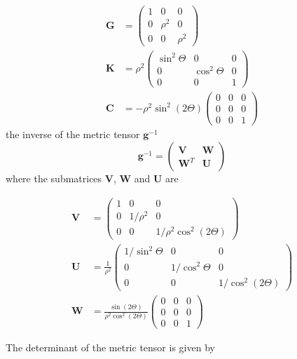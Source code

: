 \documentclass{article}
\begin{document}
\begin{align}
\bm{G} &=
\begin{pmatrix}
1 & 0      & 0\\
0 & \rho^2 & 0\\
0 & 0      & \rho^2
\end{pmatrix}\\
\bm{K} &=
\rho^2
\begin{pmatrix}
\sin^2\Theta & 0            & 0\\
0            & \cos^2\Theta & 0\\
0            & 0            & 1
\end{pmatrix}\\
\bm{C} &=
-\rho^2\sin^2(2\Theta)
\begin{pmatrix}
0 & 0 & 0\\
0 & 0 & 0\\
0 & 0 & 1
\end{pmatrix}
\end{align}
the inverse of the metric tensor $\bm{g}^{-1}$
\begin{equation}
\bm{g}^{-1}=
\begin{pmatrix}
\bm{V} & \bm{W}\\
\bm{W}^T & \bm{U}
\end{pmatrix}
\end{equation}
where the submatrices $\bm{V}$, $\bm{W}$ and $\bm{U}$ are 

\begin{align}
\bm{V} &=
\begin{pmatrix}
1 & 0      & 0\\
0 & 1/\rho^2 & 0\\
0 & 0      & 1/\rho^2\cos^2(2\Theta)
\end{pmatrix}\\
\bm{U} &=
\frac{1}{\rho^2}
\begin{pmatrix}
1/\sin^2\Theta & 0            & 0\\
0            & 1/\cos^2\Theta & 0\\
0            & 0            & 1/\cos^2(2\Theta)
\end{pmatrix}\\
\bm{W} &=
\frac{\sin(2\Theta)}{\rho^2\cos^2(2\Theta)}
\begin{pmatrix}
0 & 0 & 0\\
0 & 0 & 0\\
0 & 0 & 1
\end{pmatrix}
\end{align}

The determinant of the metric tensor is given by
\end{document}
